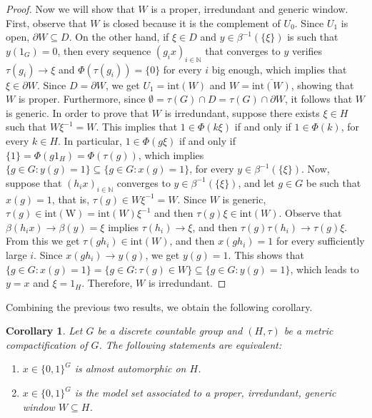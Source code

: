 \documentclass[titlepage,reqno,10pt]{amsart}
\newtheorem{corollary}[theorem]{Corollary}
\theoremstyle{definition}
\newcommand{\tm}{\subseteq}
\begin{document}
\begin{proof}
 Now we will show that $W$ is a proper, irredundant and generic window. First, observe that $W$ is closed because it is the complement of $U_0$. Since $U_1$ is open, $\partial W\subseteq D$. On the other hand, if $\xi\in D$ and $y\in\beta^{-1}(\{\xi\})$ is such that $y(1_G)=0$, then every sequence $(g_ix)_{i\in\mathbb{N}}$ that converges to $y$ verifies  $\tau(g_i)\to \xi$   and $\Phi(\tau(g_i))=\{0\}$ for every $i$ big enough, which implies that $\xi\in \partial W$. Since $D=\partial W$, we get $U_1=\mathrm{int}(W)$ and $W=\overline{\mathrm{int}(W)}$, showing that $W$ is proper. Furthermore, since $\emptyset=\tau(G)\cap D =\tau(G)\cap\partial W$, it follows that $W$ is generic. In order to prove that $W$ is irredundant, suppose there exists $\xi\in H$ such that $W\xi^{-1}=W$. This  implies  that $1\in \Phi(k\xi)$ if and only if $1\in\Phi(k)$, for every $k\in H$. In particular, $1\in \Phi(g\xi)$ if and only if $\{1\}=\Phi(g1_{H})=\Phi(\tau(g))$, which implies $\{g\in G: y(g)=1\}\subseteq \{g\in G: x(g)=1\}$, for every $y\in  \beta^{-1}(\{\xi\})$.  Now, suppose that $(h_ix)_{i\in\mathbb{N}}$ converges to $y\in\beta^{-1}(\{\xi\})$, and let $g\in G$ be such that $x(g)=1$, that is, $\tau(g)\in W\xi^{-1}=W$. Since $W$ is generic, $\tau(g)\in \mathrm{int(W)}=\mathrm{int}(W)\xi^{-1}$ and then $\tau(g)\xi\in \mathrm{int}(W) $. Observe that $\beta(h_ix)\to \beta(y)=\xi$ implies $\tau(h_i)\to \xi$, and then $\tau(g)\tau(h_i)\to \tau(g)\xi$. From this we get $\tau(gh_i)\in \mathrm{int}(W)$, and then $x(gh_i)=1$ for every sufficiently large $i$. Since $x(gh_i)\to y(g)$,    we get $y(g)=1$. This shows that $\{g\in G: x(g) = 1\} = \{g\in G: \tau(g) \in W\} \tm \{g\in G: y(g)=1\}$, which leads to $y=x$ and $\xi=1_{H}$. Therefore, $W$ is irredundant.  
\end{proof}

Combining the previous two results, we obtain the following corollary.
\begin{corollary}\label{coro-characterization}
  Let $G$ be a discrete countable group and $(H,\tau)$ be a metric compactification of $G$.   The following statements are equivalent:
\begin{enumerate}
\item   $x\in\{0,1\}^G$ is almost automorphic on  $H$.   
\item $x\in\{0,1\}^G$ is the model set associated to a proper, irredundant, generic window $W\subseteq H$.
\end{enumerate}
  \end{corollary}
\end{document}
